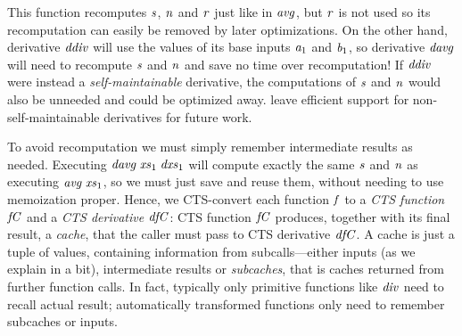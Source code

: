 This function recomputes \ensuremath{\Varid{s}}, \ensuremath{\Varid{n}} and \ensuremath{\Varid{r}} just like in \ensuremath{\Varid{avg}}, but \ensuremath{\Varid{r}} is not
used so its recomputation can easily be removed by later optimizations. On the
other hand, derivative \ensuremath{\Varid{ddiv}} will use the values of its base inputs \ensuremath{\Varid{a}_{1}} and \ensuremath{\Varid{b}_{1}},
so derivative \ensuremath{\Varid{davg}} will need to recompute \ensuremath{\Varid{s}} and \ensuremath{\Varid{n}} and save no time over
recomputation!
If \ensuremath{\Varid{ddiv}} were instead a \emph{self-maintainable} derivative, the computations
of \ensuremath{\Varid{s}} and \ensuremath{\Varid{n}} would also be unneeded and could be optimized away.
\citeauthor{CaiEtAl2014ILC} leave efficient support for non-self-maintainable
derivatives for future work.

To avoid recomputation we must simply remember intermediate results as needed.
Executing \ensuremath{\Varid{davg}\;\Varid{xs}_{1}\;\Varid{dxs}_{1}} will compute exactly the
same \ensuremath{\Varid{s}} and \ensuremath{\Varid{n}} as executing \ensuremath{\Varid{avg}\;\Varid{xs}_{1}}, so we must just save and reuse them,
without needing to use memoization proper.
Hence, we CTS-convert each function \ensuremath{\Varid{f}} to a \emph{CTS function} \ensuremath{\Varid{fC}} and a \emph{CTS
derivative} \ensuremath{\Varid{dfC}}: CTS function \ensuremath{\Varid{fC}} produces, together with its final result, a
\emph{cache}, that the caller must pass to CTS derivative \ensuremath{\Varid{dfC}}. A cache is just a tuple of
values, containing information from subcalls---either inputs (as we explain in a
bit), intermediate results or
\emph{subcaches}, that is caches returned from further function calls.
%
In fact,
typically only primitive functions like \ensuremath{\Varid{div}} need to recall actual result;
automatically transformed functions only need to remember subcaches or inputs.



